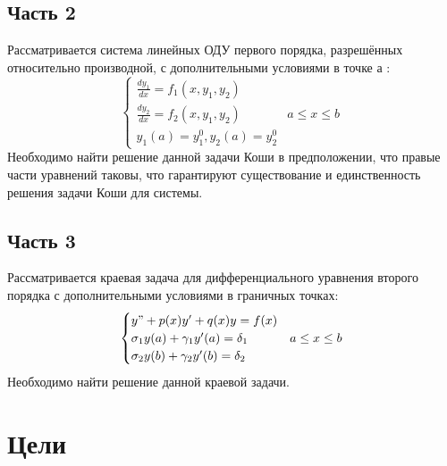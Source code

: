 \documentclass[a4paper,12pt,titlepage,finall]{article}
\begin{document}
\subsection{Часть 2}
Рассматривается система линейных ОДУ первого порядка, разрешённых относительно производной, с дополнительными условиями в точке а :
\begin{equation*}
\begin{cases}
\frac{dy_{1}}{dx} = f_{1}(x, y_{1}, y_{2})\\
\frac{dy_{2}}{dx} = f_{2}(x, y_{1}, y_{2})
 &  a \leq x \leq b  \\
y_{1}(a) = y_{1}^{0},  y_{2}(a) = y_{2}^{0}
\end{cases}
\end{equation*}
Необходимо найти решение данной задачи Коши  в предположении, что правые части уравнений таковы, что гарантируют существование и единственность решения задачи Коши для системы.

\subsection{Часть 3}
Рассматривается  краевая задача для дифференциального уравнения второго порядка с дополнительными условиями в граничных точках:
\begin{equation*}
\begin{cases}
y"+p(x)y'+q(x)y = f(x) \\
\sigma_{1}y(a) + \gamma_{1}y'(a) = \delta_{1} &  a \leq x \leq b  \\
\sigma_{2}y(b) + \gamma_{2}y'(b) = \delta_{2}
\end{cases}
\end{equation*}
Необходимо найти решение данной краевой задачи.


\newpage

\section{Цели}
\end{document}
